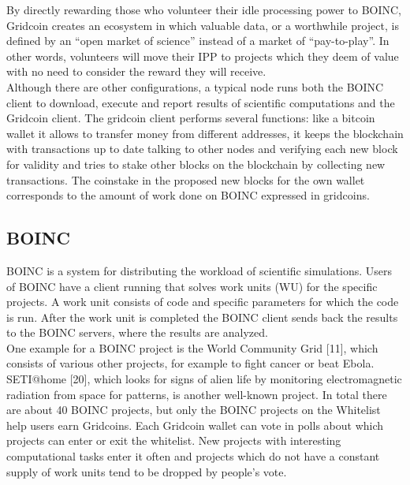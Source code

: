 By directly rewarding those who volunteer their idle processing power to BOINC, Gridcoin creates an ecosystem in which valuable data, or a worthwhile project, is defined by an “open market of science” instead of a market of “pay-to-play”.  In other words, volunteers will move their IPP to projects which they deem of value with no need to consider the reward they will receive.\\

Although there are other configurations, a typical node runs both the BOINC client to download, execute and report results of scientific computations and the Gridcoin client. The gridcoin client performs several functions: like a bitcoin wallet it allows to transfer money from different addresses, it keeps the blockchain with transactions up to date talking to other nodes and verifying each new block for validity and tries to stake other blocks on the blockchain by collecting new transactions. The coinstake in the proposed new blocks for the own wallet corresponds to the amount of work done on BOINC expressed in gridcoins.\\

\subsection{BOINC}

BOINC is a system for distributing the workload of scientific simulations. Users of BOINC have a client running that solves work units (WU) for the specific projects. A work unit consists of code and specific parameters for which the code is run.  After the work unit is completed the BOINC client sends back the results to the BOINC servers, where the results are analyzed.\\

One example for a BOINC project is the World Community Grid [11], which consists of various other projects, for example to fight cancer or beat Ebola. SETI@home [20], which looks for signs of alien life by monitoring electromagnetic radiation from space for patterns, is another well-known project.  In total there are about 40 BOINC projects, but only the BOINC projects on the Whitelist help users earn Gridcoins. Each Gridcoin wallet can vote in polls about which projects can enter or exit the whitelist. New projects with interesting computational tasks enter it often and projects which do not have a constant supply of work units tend to be dropped by people's vote. \\

